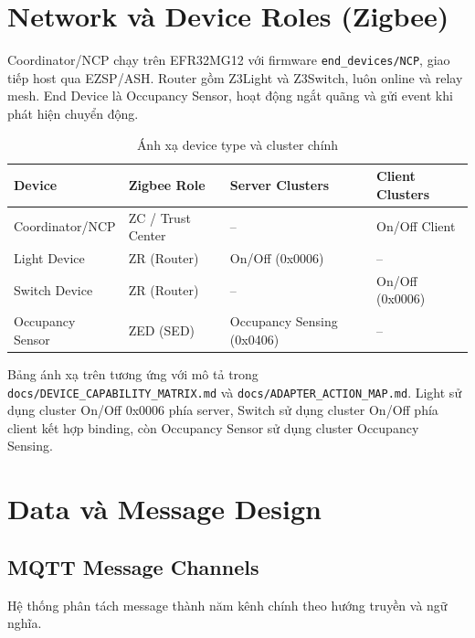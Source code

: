 \section{Network và Device Roles (Zigbee)}
\label{sec:ch2-device-roles}

Coordinator/NCP chạy trên EFR32MG12 với firmware
\texttt{end\_devices/NCP}, giao tiếp host qua EZSP/ASH. Router gồm
Z3Light và Z3Switch, luôn online và relay mesh. End Device là
Occupancy Sensor, hoạt động ngắt quãng và gửi event khi phát hiện
chuyển động.

\begin{table}[H]
\centering
\caption{Ánh xạ device type và cluster chính}
\label{tab:ch2-device-roles}
\begin{tabular}{|l|l|l|l|}
\hline
\textbf{Device} & \textbf{Zigbee Role} & \textbf{Server Clusters}
  & \textbf{Client Clusters} \\ \hline
Coordinator/NCP & ZC / Trust Center & -- & On/Off Client \\ \hline
Light Device & ZR (Router) & On/Off (0x0006) & -- \\ \hline
Switch Device & ZR (Router) & -- & On/Off (0x0006) \\ \hline
Occupancy Sensor & ZED (SED) & Occupancy Sensing (0x0406) & -- \\ \hline
\end{tabular}
\end{table}

Bảng ánh xạ trên tương ứng với mô tả trong
\texttt{docs/DEVICE\_CAPABILITY\_MATRIX.md} và
\texttt{docs/ADAPTER\_ACTION\_MAP.md}. Light sử dụng cluster On/Off
0x0006 phía server, Switch sử dụng cluster On/Off phía client kết
hợp binding, còn Occupancy Sensor sử dụng cluster Occupancy Sensing.

\section{Data và Message Design}
\label{sec:ch2-data-design}

\subsection{MQTT Message Channels}
\label{sec:ch2-channels}

Hệ thống phân tách message thành năm kênh chính theo hướng truyền
và ngữ nghĩa.

